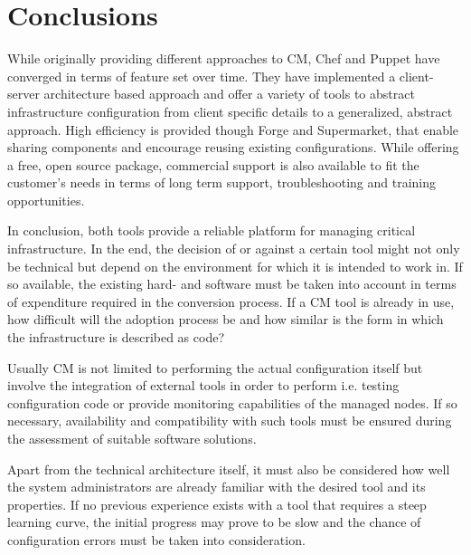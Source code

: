 \section{Conclusions}

While originally providing different approaches to CM, Chef and Puppet have converged in terms of feature set over time. They have implemented a client-server architecture based approach and offer a variety of tools to abstract infrastructure configuration from client specific details to a generalized, abstract approach. High efficiency is provided though Forge and Supermarket, that enable sharing components and encourage reusing existing configurations. While offering a free, open source package, commercial support is also available to fit the customer's needs in terms of long term support, troubleshooting and training opportunities.


In conclusion, both tools provide a reliable platform for managing critical infrastructure. In the end, the decision of or against a certain tool might not only be technical but depend on the environment for which it is intended to work in. If so available, the existing hard- and software must be taken into account in terms of expenditure required in the conversion process. If a CM tool is already in use, how difficult will the adoption process be and how similar is the form in which the infrastructure is described as code?

Usually CM is not limited to performing the actual configuration itself but involve the integration of external tools in order to perform i.e. testing configuration code or provide monitoring capabilities of the managed nodes. If so necessary, availability and compatibility with such tools must be ensured during the assessment of suitable software solutions.

Apart from the technical architecture itself, it must also be considered how well the system administrators are already familiar with the desired tool and its properties. If no previous experience exists with a tool that requires a steep learning curve, the initial progress may prove to be slow and the chance of configuration errors must be taken into consideration.




